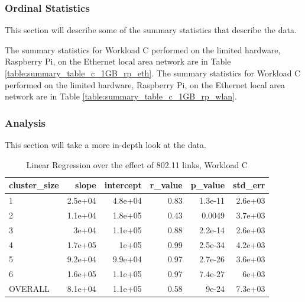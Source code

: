 \subsubsection{Ordinal Statistics}
This section will describe some of the summary statistics that describe the data.  

The summary statistics for Workload C performed on the limited hardware, Raspberry Pi, on the Ethernet local area network are in Table \ref{table:summary_table_c_1GB_rp_eth}.
The summary statistics for Workload C performed on the limited hardware, Raspberry Pi, on the Ethernet local area network are in Table \ref{table:summary_table_c_1GB_rp_wlan}.



\subsubsection{Analysis}
This section will take a more in-depth look at the data.




\begin{table}[H]
\centering
\begin{tabular}{lrrrrr}
\toprule
cluster\_size &   slope &  intercept &  r\_value &  p\_value &  std\_err \\
\midrule
           1 & 2.5e+04 &    4.8e+04 &     0.83 &  1.3e-11 &  2.6e+03 \\
           2 & 1.1e+04 &    1.8e+05 &     0.43 &   0.0049 &  3.7e+03 \\
           3 &   3e+04 &    1.1e+05 &     0.88 &  2.2e-14 &  2.6e+03 \\
           4 & 1.7e+05 &      1e+05 &     0.99 &  2.5e-34 &  4.2e+03 \\
           5 & 9.2e+04 &    9.9e+04 &     0.97 &  2.7e-26 &  3.6e+03 \\
           6 & 1.6e+05 &    1.1e+05 &     0.97 &  7.4e-27 &    6e+03 \\
     OVERALL & 8.1e+04 &    1.1e+05 &     0.58 &    9e-24 &  7.3e+03 \\
\bottomrule
\end{tabular}
\caption{Linear Regression over the effect of 802.11 links, Workload C}
\label{table:wlan_v_eth_c}
\end{table}





